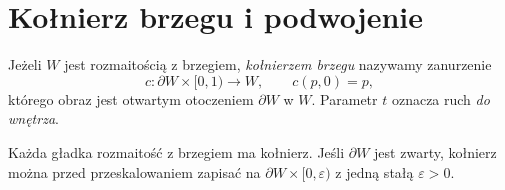 \section{Kołnierz brzegu i podwojenie}
\label{sec:kolnierz-15}

\begin{definicja}[Kołnierz]
Jeżeli $W$ jest rozmaitością z brzegiem,
\emph{kołnierzem brzegu} nazywamy zanurzenie
\[
 c:\partial W\times[0,1)\longrightarrow W,
 \qquad c(p,0)=p,
\]
którego obraz jest otwartym otoczeniem
$\partial W$ w $W$. Parametr $t$
oznacza ruch \emph{do wnętrza}.
\end{definicja}

\begin{twierdzenie}
\label{thm:kolnierz-15}
Każda gładka rozmaitość z brzegiem
ma kołnierz. Jeśli $\partial W$ jest
zwarty, kołnierz można przed
przeskalowaniem zapisać na
$\partial W\times[0,\varepsilon)$
z jedną stałą $\varepsilon>0$.
\end{twierdzenie}
